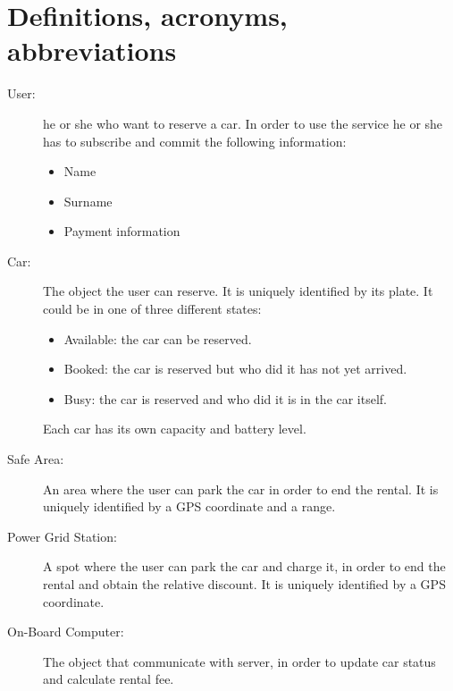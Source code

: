 \section{Definitions, acronyms, abbreviations}
\begin{description}
	\item [User:] he or she who want to reserve a car. In order to use the service he or she has to subscribe and commit the following information:
	\begin{itemize}
		\item Name
		\item Surname
		\item Payment information
	\end{itemize}
	\item [Car:] The object the user can reserve. It is uniquely identified by its plate. It could be in one of three different states:
	\begin{itemize}
		\item Available: the car can be reserved.
		\item Booked: the car is reserved but who did it has not yet arrived.
		\item Busy: the car is reserved and who did it is in the car itself.
	\end{itemize}
	Each car has its own capacity and battery level.
	\item [Safe Area:] An area where the user can park the car in order to end the rental. It is uniquely identified by a GPS coordinate and a range.
	\item [Power Grid Station:] A spot where the user can park the car and charge it, in order to end the rental and obtain the relative discount. It is uniquely identified by a GPS coordinate.
	\item [On-Board Computer:] The object that communicate with server, in order to update car status and calculate rental fee.
	
\end{description}
